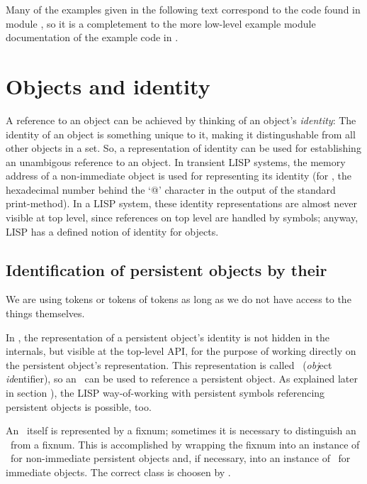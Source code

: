 Many of the examples given in the following text correspond to the
code found in module
, so it is a
completement to the more low-level example module documentation of the
example code in .

\section{Objects and identity}

A reference to an object can be achieved by thinking of an object's
\emph{identity}: The identity of an object is something
unique to it, making it distingushable from all other objects in a
set. So, a representation of identity can be used for establishing an
unambigous reference to an object. In transient LISP systems, the
memory address of a non-immediate object is used for representing its
identity (for \allegrocl, the hexadecimal number behind the `@'
character in the output of the standard print-method).  In a LISP
system, these identity representations are almost never visible at top
level, since references on top level are handled by symbols; anyway,
LISP has a defined notion of identity for objects.

\subsection[Identification of objects]%
{Identification of persistent objects by their
\protect\objid}%
\label{sec:IdByObjId}

\begin{fortune}%
We are using tokens or tokens of tokens as long as we do not have
access to the things themselves.
\end{fortune}%

In \plobwoexcl, the representation of a persistent object's identity
is not hidden in the internals, but visible at the top-level API, for
the purpose of working directly on the persistent object's
representation.  This representation is called \objid\ (\emph{obj}ect
\emph{id}entifier), so an \objid\ can be used to reference a
persistent object. As explained later in
section ), the LISP way-of-working
with persistent symbols referencing persistent objects is possible,
too.

An \objid\ itself is represented by a fixnum; sometimes it is necessary to distinguish an \objid\ from
a fixnum.  This is accomplished by wrapping the fixnum into an
instance of \ for non-immediate persistent
objects and, if necessary, into an instance of
\ for immediate objects. The
correct class is choosen by .

